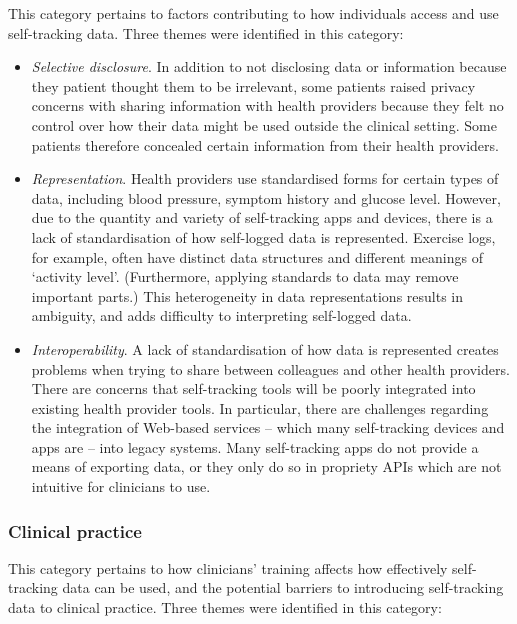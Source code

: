 \documentclass{sigchi}
\begin{document}
This category pertains to factors contributing to how individuals access and use self-tracking data. Three themes were identified in this category:

\begin{itemize}
    \item \textit{Selective disclosure}. In addition to not disclosing data or information because they patient thought them to be irrelevant, some patients raised privacy concerns with sharing information with health providers because they felt no control over how their data might be used outside the clinical setting. Some patients therefore concealed certain information from their health providers.
    
    \item \textit{Representation}. Health providers use standardised forms for certain types of data, including blood pressure, symptom history and glucose level. However, due to the quantity and variety of self-tracking apps and devices, there is a lack of standardisation of how self-logged data is represented.  Exercise logs, for example, often have distinct data structures and different meanings of `activity level'. (Furthermore, applying standards to data may remove important parts.)  This heterogeneity in data representations results in ambiguity, and adds difficulty to interpreting self-logged data.
    
   
    
    \item \textit{Interoperability}. A lack of standardisation of how data is represented creates problems when trying to share between colleagues and other health providers. There are concerns that self-tracking tools will be poorly integrated into existing health provider tools. In particular, there are challenges regarding the integration of Web-based services -- which many self-tracking devices and apps are -- into legacy systems. Many self-tracking apps do not provide a means of exporting data, or they only do so in propriety APIs which are not intuitive for clinicians to use.
\end{itemize}

\subsubsection{Clinical practice}

This category pertains to how clinicians' training affects how effectively self-tracking data can be used, and the potential barriers to introducing self-tracking data to clinical practice. Three themes were identified in this category:
\end{document}
